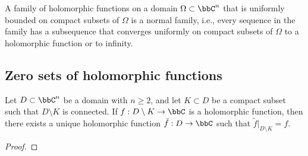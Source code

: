 \begin{theorem}\label{thm:Montel's_Theorem}
	A family of holomorphic functions on a domain \(\Omega \subset \bbC^n\) that is uniformly bounded on compact subsets of \(\Omega\) is a normal family, i.e., every sequence in the family has a subsequence that converges uniformly on compact subsets of \(\Omega\) to a holomorphic function or to infinity.
\end{theorem}

\subsection{Zero sets of holomorphic functions}

\begin{theorem}\label{thm:Hartogs'_Extension_Theorem}
	Let \(D \subset \bbC^n\) be a domain with \(n \geq 2\), and let \(K \subset D\) be a compact subset such that \(D \setminus K\) is connected.
	If \(f: D \setminus K \to \bbC\) is a holomorphic function, then there exists a unique holomorphic function \(\tilde{f}: D \to \bbC\) such that \(\tilde{f}|_{D \setminus K} = f\).
\end{theorem}
\begin{proof}
\end{proof}



